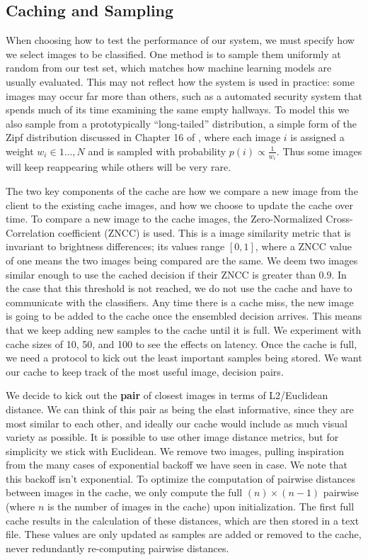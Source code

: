 \documentclass[12pt]{article}
\begin{document}
\subsection{Caching and Sampling}

When choosing how to test the performance of our system, we must specify how we select images to be classified.
One method is to sample them uniformly at random from our test set, which matches how machine learning models are usually evaluated.
This may not reflect how the system is used in practice: some images may occur far more than others, such as a automated security system that spends much of its time examining the same empty hallways.
To model this we also sample from a prototypically ``long-tailed'' distribution, a simple form of the Zipf distribution discussed in Chapter 16 of \cite{mitzenmacher}, where each image $i$ is assigned a weight $w_i\in 1\ldots, N$
    and is sampled with probability $p(i)\propto \frac{1}{w_i}$.
Thus some images will keep reappearing while others will be very rare.

The two key components of the cache are how we compare a new image from the client to the existing cache images, and how we choose to update the cache over time. To compare a new image to the cache images, the Zero-Normalized Cross-Correlation coefficient (ZNCC) is used. This is a image similarity metric that is invariant to brightness differences; its values range $[0,1]$, where a ZNCC value of one means the two images being compared are the same. We deem two images similar enough to use the cached decision if their ZNCC is greater than $0.9$. In the case that this threshold is not reached, we do not use the cache and have to communicate with the classifiers. Any time there is a cache miss, the new image is going to be added to the cache once the ensembled decision arrives. This means that we keep adding new samples to the cache until it is full. We experiment with cache sizes of 10, 50, and 100 to see the effects on latency. Once the cache is full, we need a protocol to kick out the least important samples being stored. We want our cache to keep track of the most useful image, decision pairs. 

We decide to kick out the \textbf{pair} of closest images in terms of L2/Euclidean distance. We can think of this pair as being the elast informative, since they are most similar to each other, and ideally our cache would include as much visual variety as possible. It is possible to use other image distance metrics, but for simplicity we stick with Euclidean. We remove two images, pulling inspiration from the many cases of exponential backoff we have seen in case. We note that this backoff isn't exponential. To optimize the computation of pairwise distances between images in the cache, we only compute the full $(n) \times (n-1)$ pairwise (where $n$ is the number of images in the cache) upon initialization. The first full cache results in the calculation of these distances, which are then stored in a text file. These values are only updated as samples are added or removed to the cache, never redundantly re-computing pairwise distances.
\end{document}
